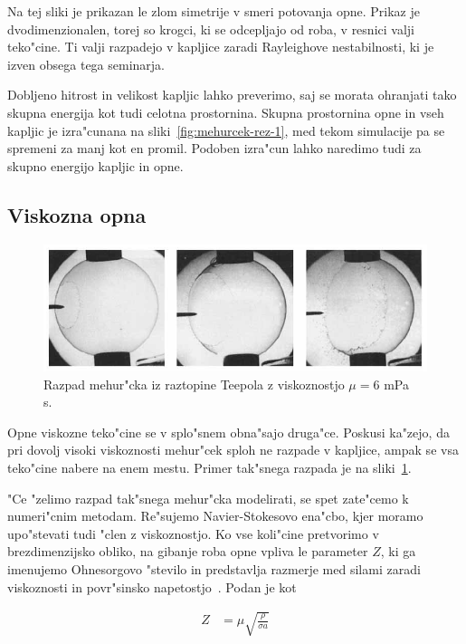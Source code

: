 \documentclass[a4paper,12pt]{article}
\begin{document}
Na tej sliki je prikazan le zlom simetrije v smeri potovanja opne. Prikaz je dvodimenzionalen, torej so krogci, ki se odcepljajo od roba, v resnici valji teko"cine. Ti valji razpadejo v kapljice zaradi Rayleighove nestabilnosti, ki je izven obsega tega seminarja. 

Dobljeno hitrost in velikost kapljic lahko preverimo, saj se morata ohranjati tako skupna energija kot tudi celotna prostornina. Skupna prostornina opne in vseh kapljic je izra"cunana na sliki~\ref{fig:mehurcek-rez-1}, med tekom simulacije pa se spremeni za manj kot en promil. Podoben izra"cun lahko naredimo tudi za skupno energijo kapljic in opne.

\subsection{Viskozna opna}
\begin{figure}[h]
  \centering
\includegraphics[width=.9\textwidth]{./Slike/meh-vis-1}
\caption{Razpad mehur"cka iz raztopine Teepola z viskoznostjo $\mu = 6$ mPa s.~\cite{pandit}}
\label{fig:mehurcek-viskozni-razpad}
\end{figure}

Opne viskozne teko"cine se v splo"snem obna"sajo druga"ce. Poskusi ka"zejo, da pri dovolj visoki viskoznosti mehur"cek sploh ne razpade v kapljice, ampak se vsa teko"cine nabere na enem mestu. Primer tak"snega razpada je na sliki~\ref{fig:mehurcek-viskozni-razpad}. 

"Ce "zelimo razpad tak"snega mehur"cka modelirati, se spet zate"cemo k numeri"cnim metodam. Re"sujemo Navier-Stokesovo ena"cbo, kjer moramo upo"stevati tudi "clen z viskoznostjo. Ko vse koli"cine pretvorimo v brezdimenzijsko obliko, na gibanje roba opne vpliva le parameter $Z$, ki ga imenujemo Ohnesorgovo "stevilo in predstavlja razmerje med silami zaradi viskoznosti in povr"sinsko napetostjo~\cite{scat}. Podan je kot

\begin{align}
Z &= \mu\sqrt{\frac{\rho}{\sigma a}} 
\end{align}
\end{document}
